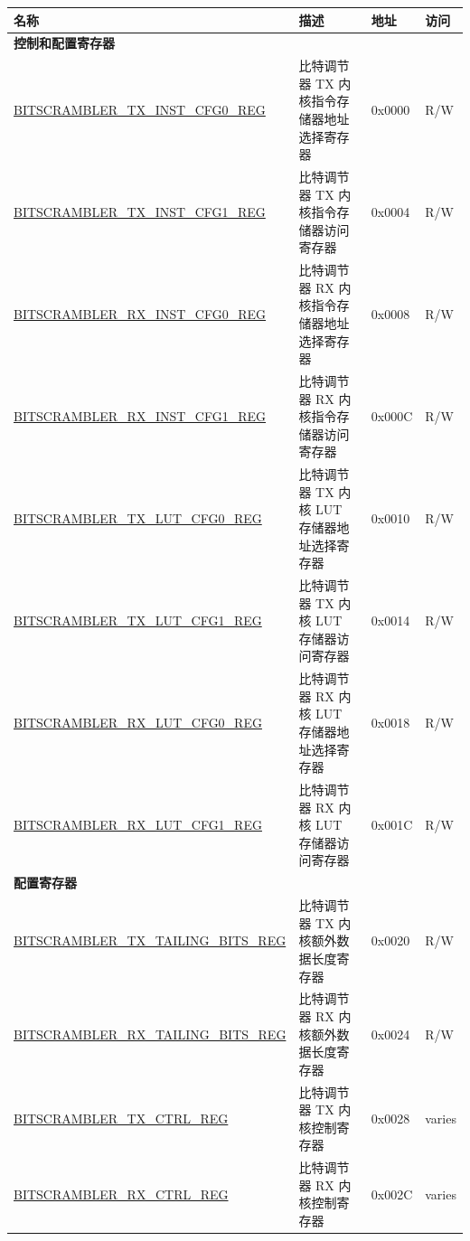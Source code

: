 \begin{longtable}{ | p{6.3cm} | p{7cm} | p{1.2cm} | p{1cm} | }
\hline\rowcolor{lightgray}
名称 & 描述 & 地址 & 访问\\ \hline
\endhead
\multicolumn{4}{|l|}{\textbf{控制和配置寄存器}} \\ \hline
\hyperref[regdesc:BITSCRAMBLERTXINSTCFG0REG]{BITSCRAMBLER\_TX\_INST\_CFG0\_REG} & 比特调节器 TX 内核指令存储器地址选择寄存器 & 0x0000 & R/W \\ \hline
\hyperref[regdesc:BITSCRAMBLERTXINSTCFG1REG]{BITSCRAMBLER\_TX\_INST\_CFG1\_REG} & 比特调节器 TX 内核指令存储器访问寄存器 & 0x0004 & R/W \\ \hline
\hyperref[regdesc:BITSCRAMBLERRXINSTCFG0REG]{BITSCRAMBLER\_RX\_INST\_CFG0\_REG} & 比特调节器 RX 内核指令存储器地址选择寄存器 & 0x0008 & R/W \\ \hline
\hyperref[regdesc:BITSCRAMBLERRXINSTCFG1REG]{BITSCRAMBLER\_RX\_INST\_CFG1\_REG} & 比特调节器 RX 内核指令存储器访问寄存器 & 0x000C & R/W \\ \hline
\hyperref[regdesc:BITSCRAMBLERTXLUTCFG0REG]{BITSCRAMBLER\_TX\_LUT\_CFG0\_REG} & 比特调节器 TX 内核 LUT 存储器地址选择寄存器 & 0x0010 & R/W \\ \hline
\hyperref[regdesc:BITSCRAMBLERTXLUTCFG1REG]{BITSCRAMBLER\_TX\_LUT\_CFG1\_REG} & 比特调节器 TX 内核 LUT 存储器访问寄存器 & 0x0014 & R/W \\ \hline
\hyperref[regdesc:BITSCRAMBLERRXLUTCFG0REG]{BITSCRAMBLER\_RX\_LUT\_CFG0\_REG} & 比特调节器 RX 内核 LUT 存储器地址选择寄存器 & 0x0018 & R/W \\ \hline
\hyperref[regdesc:BITSCRAMBLERRXLUTCFG1REG]{BITSCRAMBLER\_RX\_LUT\_CFG1\_REG} & 比特调节器 RX 内核 LUT 存储器访问寄存器 & 0x001C & R/W \\ \hline
\multicolumn{4}{|l|}{\textbf{配置寄存器}} \\ \hline
\hyperref[regdesc:BITSCRAMBLERTXTAILINGBITSREG]{BITSCRAMBLER\_TX\_TAILING\_BITS\_REG} & 比特调节器 TX 内核额外数据长度寄存器 & 0x0020 & R/W \\ \hline
\hyperref[regdesc:BITSCRAMBLERRXTAILINGBITSREG]{BITSCRAMBLER\_RX\_TAILING\_BITS\_REG} & 比特调节器 RX 内核额外数据长度寄存器 & 0x0024 & R/W \\ \hline
\hyperref[regdesc:BITSCRAMBLERTXCTRLREG]{BITSCRAMBLER\_TX\_CTRL\_REG} & 比特调节器 TX 内核控制寄存器 & 0x0028 & varies \\ \hline
\hyperref[regdesc:BITSCRAMBLERRXCTRLREG]{BITSCRAMBLER\_RX\_CTRL\_REG} & 比特调节器 RX 内核控制寄存器 & 0x002C & varies \\ \hline

\end{longtable}
